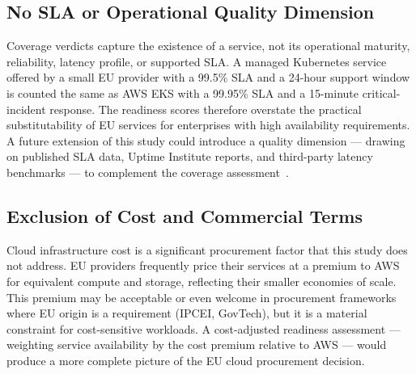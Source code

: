 \subsection{No SLA or Operational Quality Dimension}

Coverage verdicts capture the existence of a service, not its operational maturity, reliability, latency profile, or supported SLA. A managed Kubernetes service offered by a small EU provider with a 99.5\% SLA and a 24-hour support window is counted the same as AWS EKS with a 99.95\% SLA and a 15-minute critical-incident response. The readiness scores therefore overstate the practical substitutability of EU services for enterprises with high availability requirements. A future extension of this study could introduce a quality dimension — drawing on published SLA data, Uptime Institute reports, and third-party latency benchmarks — to complement the coverage assessment~\cite{AWS_WellArchitected_2023}.

\subsection{Exclusion of Cost and Commercial Terms}

Cloud infrastructure cost is a significant procurement factor that this study does not address. EU providers frequently price their services at a premium to AWS for equivalent compute and storage, reflecting their smaller economies of scale. This premium may be acceptable or even welcome in procurement frameworks where EU origin is a requirement (IPCEI, GovTech), but it is a material constraint for cost-sensitive workloads. A cost-adjusted readiness assessment — weighting service availability by the cost premium relative to AWS — would produce a more complete picture of the EU cloud procurement decision.
